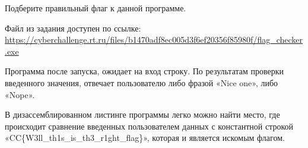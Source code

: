 
Подберите правильный флаг к данной программе.

Файл из задания доступен по ссылке: \url{https://cyberchallenge.rt.ru/files/b1470adf8ec005d3f6ef20356f85980f/flag_checker.exe}

\solutionSection

Программа после запуска, ожидает на вход строку. По результатам проверки введенного значения, отвечает пользователю либо фразой «Nice one», либо «Nope».

В дизассемблированном листинге программы легко можно найти место, где происходит сравнение введенных пользователем данных с константной строкой \linebreak «CC\{W3ll\_th1s\_is\_th3\_r1ght\_flag\}», которая и является искомым флагом.
 

